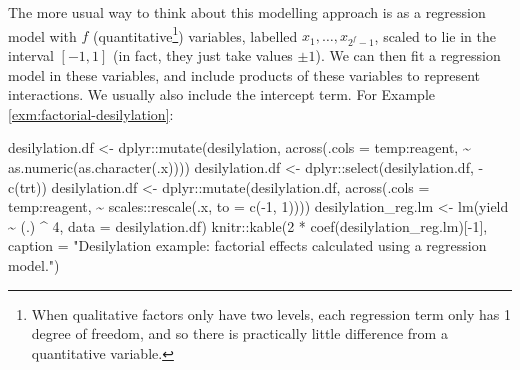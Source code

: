 \documentclass[
]{book}
\newenvironment{Shaded}{\begin{snugshade}}{\end{snugshade}}
\newcommand{\AttributeTok}[1]{\textcolor[rgb]{0.77,0.63,0.00}{#1}}
\newcommand{\DecValTok}[1]{\textcolor[rgb]{0.00,0.00,0.81}{#1}}
\newcommand{\FunctionTok}[1]{\textcolor[rgb]{0.00,0.00,0.00}{#1}}
\newcommand{\NormalTok}[1]{#1}
\newcommand{\OtherTok}[1]{\textcolor[rgb]{0.56,0.35,0.01}{#1}}
\newcommand{\SpecialCharTok}[1]{\textcolor[rgb]{0.00,0.00,0.00}{#1}}
\newcommand{\StringTok}[1]{\textcolor[rgb]{0.31,0.60,0.02}{#1}}
\theoremstyle{definition}
\theoremstyle{definition}
\theoremstyle{definition}
\theoremstyle{definition}
\theoremstyle{remark}
\begin{document}
The more usual way to think about this modelling approach is as a regression model with \(f\) (quantitative\footnote{When qualitative factors only have two levels, each regression term only has 1 degree of freedom, and so there is practically little difference from a quantitative variable.}) variables, labelled \(x_1, \ldots, x_{2^f-1}\), scaled to lie in the interval \([-1, 1]\) (in fact, they just take values \(\pm 1\)). We can then fit a regression model in these variables, and include products of these variables to represent interactions. We usually also include the intercept term. For Example \ref{exm:factorial-desilylation}:

\begin{Shaded}
\begin{Highlighting}[]
\NormalTok{desilylation.df }\OtherTok{\textless{}{-}}\NormalTok{ dplyr}\SpecialCharTok{::}\FunctionTok{mutate}\NormalTok{(desilylation, }
                                      \FunctionTok{across}\NormalTok{(}\AttributeTok{.cols =}\NormalTok{ temp}\SpecialCharTok{:}\NormalTok{reagent, }
                                             \SpecialCharTok{\textasciitilde{}} \FunctionTok{as.numeric}\NormalTok{(}\FunctionTok{as.character}\NormalTok{(.x))))}
\NormalTok{desilylation.df }\OtherTok{\textless{}{-}}\NormalTok{ dplyr}\SpecialCharTok{::}\FunctionTok{select}\NormalTok{(desilylation.df, }\SpecialCharTok{{-}}\FunctionTok{c}\NormalTok{(trt))}
\NormalTok{desilylation.df }\OtherTok{\textless{}{-}}\NormalTok{ dplyr}\SpecialCharTok{::}\FunctionTok{mutate}\NormalTok{(desilylation.df, }\FunctionTok{across}\NormalTok{(}\AttributeTok{.cols =}\NormalTok{ temp}\SpecialCharTok{:}\NormalTok{reagent, }
                                               \SpecialCharTok{\textasciitilde{}}\NormalTok{ scales}\SpecialCharTok{::}\FunctionTok{rescale}\NormalTok{(.x, }\AttributeTok{to =} \FunctionTok{c}\NormalTok{(}\SpecialCharTok{{-}}\DecValTok{1}\NormalTok{, }\DecValTok{1}\NormalTok{))))}
\NormalTok{desilylation\_reg.lm }\OtherTok{\textless{}{-}} \FunctionTok{lm}\NormalTok{(yield }\SpecialCharTok{\textasciitilde{}}\NormalTok{ (.) }\SpecialCharTok{\^{}} \DecValTok{4}\NormalTok{, }\AttributeTok{data =}\NormalTok{ desilylation.df)}
\NormalTok{knitr}\SpecialCharTok{::}\FunctionTok{kable}\NormalTok{(}\DecValTok{2} \SpecialCharTok{*} \FunctionTok{coef}\NormalTok{(desilylation\_reg.lm)[}\SpecialCharTok{{-}}\DecValTok{1}\NormalTok{], }\AttributeTok{caption =} \StringTok{"Desilylation example: factorial effects calculated using a regression model."}\NormalTok{)}
\end{Highlighting}
\end{Shaded}
\end{document}
